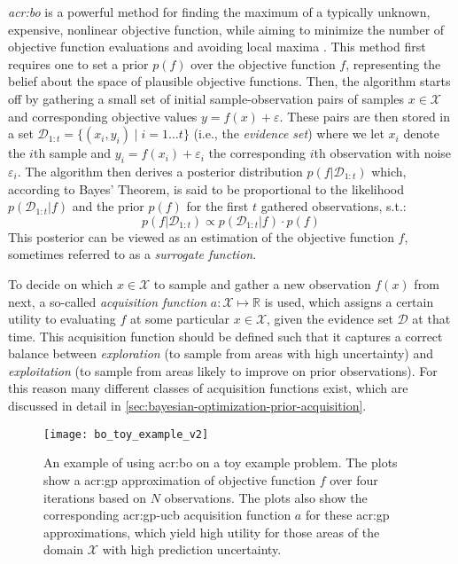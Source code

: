 \textit{\acrfull{acr:bo}} is a powerful method for finding the maximum of a typically unknown, expensive, nonlinear objective function, while aiming to minimize the number of objective function evaluations and avoiding local maxima \cite{Brochu2010}.
This method first requires one to set a prior $p(f)$ over the objective function $f$, representing the belief about the space of plausible objective functions.
Then, the algorithm starts off by gathering a small set of initial sample-observation pairs of samples $x \in \mathcal{X}$ and corresponding objective values $y = f(x) + \varepsilon$.
These pairs are then stored in a set $\mathcal{D}_{1:t} = \{(x_i, y_i) \mid i = 1 \ldots t\}$ (i.e., the \textit{evidence set}) where we let $x_i$ denote the $i$th sample and $y_i = f(x_i) + \varepsilon_i$ the corresponding $i$th observation with noise $\varepsilon_i$.
The algorithm then derives a posterior distribution $p(f \vert \mathcal{D}_{1:t})$ which, according to Bayes' Theorem, is said to be proportional to the likelihood $p(\mathcal{D}_{1:t} \vert f)$ and the prior $p(f)$ for the first $t$ gathered observations, s.t.:
\begin{equation}
	p(f \vert \mathcal{D}_{1:t}) \propto p(\mathcal{D}_{1:t} \vert f) \cdot p(f)
\end{equation}
This posterior can be viewed as an estimation of the objective function $f$, sometimes referred to as a \textit{surrogate function}.

To decide on which $x \in \mathcal{X}$ to sample and gather a new observation $f(x)$ from next, a so-called \textit{acquisition function} $a: \mathcal{X} \mapsto \mathbb{R}$ is used, which assigns a certain utility to evaluating $f$ at some particular $x \in \mathcal{X}$, given the evidence set $\mathcal{D}$ at that time.
This acquisition function should be defined such that it captures a correct balance between \textit{exploration} (to sample from areas with high uncertainty) and \textit{exploitation} (to sample from areas likely to improve on prior observations). For this reason many different classes of acquisition functions exist, which are discussed in detail in \autoref{sec:bayesian-optimization-prior-acquisition}.

\begin{figure}
	\centering
	\texttt{[image: bo\_toy\_example\_v2]}
	\caption{An example of using \acrlong{acr:bo} on a toy example problem. The plots show a \acrshort{acr:gp} approximation of objective function $f$ over four iterations based on $N$ observations. The plots also show the corresponding \acrshort{acr:gp-ucb} acquisition function $a$ for these \acrshort{acr:gp} approximations, which yield high utility for those areas of the domain $\mathcal{X}$ with high prediction uncertainty.}
	\label{fig:bo-toy-example}
\end{figure}

